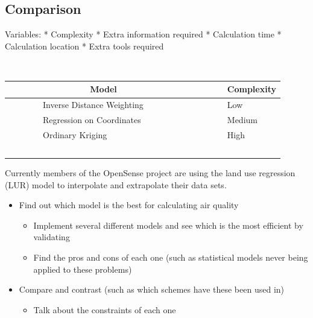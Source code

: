 \subsection{Comparison}\label{interpolationcomparison}

Variables:
	* Complexity
	* Extra information required
	* Calculation time
	* Calculation location
	* Extra tools required

\begin{table}
    \begin{tabular}{|l|l|}
        \hline
        Model                      & Complexity  \\ \hline
        Inverse Distance Weighting & Low         \\ 
        Regression on Coordinates  & Medium      \\ 
        Ordinary Kriging           & High        \\ 
        \hline
    \end{tabular}
\end{table}

Currently members of the OpenSense project are using the land use regression (LUR) model to interpolate and extrapolate their data sets. 
	\begin{itemize}
	    \item Find out which model is the best for calculating air quality
	    \begin{itemize}
	        \item Implement several different models and see which is the most efficient by validating
	        \item Find the pros and cons of each one (such as statistical models never being applied to these problems)
	    \end{itemize}
	    \item Compare and contrast (such as which schemes have these been used in)
	    \begin{itemize}
	        \item Talk about the constraints of each one
	    \end{itemize}
	\end{itemize}




